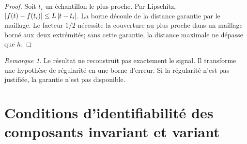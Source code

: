 \documentclass[11pt,oneside]{book}
\theoremstyle{definition}\newtheorem{definition}[theoreme]{Définition}\newtheorem{hypothese}[theoreme]{Hypothèse explicite}\newtheorem{convention}[theoreme]{Convention}\newtheorem{critere}[theoreme]{Critère}
\theoremstyle{remark}\newtheorem{remarque}[theoreme]{Remarque}\newtheorem{contreexemple}[theoreme]{Contre-exemple}
\begin{document}
\begin{proof}
Soit \(t_i\) un échantillon le plus proche. Par Lipschitz, \(\left\lvert f(t)-f(t_i)\right\rvert\le L\left\lvert t-t_i\right\rvert\). La borne découle de la distance garantie par le maillage. Le facteur \(1/2\) nécessite la couverture au plus proche dans un maillage borné aux deux extrémités; sans cette garantie, la distance maximale ne dépasse que \(h\).\end{proof}
\begin{remarque}
Le résultat ne reconstruit pas exactement le signal. Il transforme une hypothèse de régularité en une borne d'erreur. Si la régularité n'est pas justifiée, la garantie n'est pas disponible.
\end{remarque}

\chapter{Conditions d'identifiabilité des composants invariant et variant}
\end{document}
